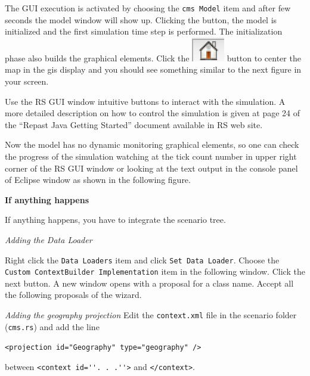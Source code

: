 \documentclass{article}
\begin{document}
\vskip2mm
The GUI execution is activated by choosing the \verb+cms Model+ item and after few seconds the model window will show up. Clicking the  button, the model is initialized and the first simulation time step is performed. The initialization phase also builds the graphical elements. Click the \includegraphics[scale=0.4]{fig_home} button to center the map in the gis display and you should see something similar to the next figure in your screen.

Use the RS GUI window intuitive buttons to interact with the simulation. A more detailed description on how to control the simulation is given at page 24 of the ``Repast Java Getting Started'' document available in RS web site.

Now the model has no dynamic monitoring graphical elements, so one can check the progress of the simulation watching at the tick count number in upper right corner of the RS GUI window or looking at the text output in the console panel of Eclipse window as shown in the following figure. 

\textbf{If anything happens}

If anything happens, you have to integrate the scenario tree.

\textit{Adding the Data Loader}

Right click the \verb+Data Loaders+ item and click \verb+Set Data Loader+. Choose the \verb+Custom ContextBuilder Implementation+ item in the following window. Click the next button. A new window opens with a proposal for a class name. Accept all the following proposals of the wizard.

\textit{Adding the geography projection}
Edit the \verb+context.xml+ file in the scenario folder (\verb+cms.rs+) and add the line

\verb+<projection id="Geography" type="geography" />+

between \verb+<context id=''. . .''>+ and \verb+</context>+.
\end{document}
